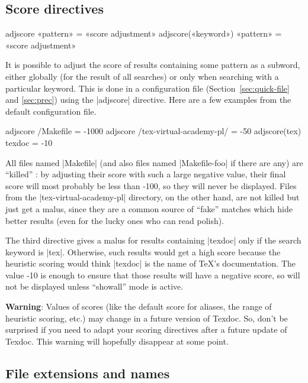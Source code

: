 \documentclass[draft]{texdoc-doc}
\begin{document}
\subsection{Score directives}
\label{sec:score}

\begin{htcode}
adjscore «pattern» = «score adjustment»
adjscore(«keyword») «pattern» = «score adjustment»
\end{htcode}
%
It is possible to adjust the score of results containing some pattern as a
subword, either globally (for the result of all searches) or only when
searching with a particular keyword. This is done in a configuration file
(Section~\ref{sec:quick-file} and \ref{sec:prec}) using the |adjscore|
directive. Here are a few examples from the default configuration file.

\begin{htcode}
adjscore /Makefile = -1000
adjscore /tex-virtual-academy-pl/ = -50
adjscore(tex) texdoc = -10
\end{htcode}
%
All files named |Makefile| (and also files named |Makefile-foo| if there are
any) are ``killed'' : by adjusting their score with such a large negative
value, their final score will most probably be less than -100, so they will
never be displayed. Files from the |tex-virtual-academy-pl| directory, on the
other hand, are not killed but just get a malus, since they are a common
source of ``fake'' matches which hide better results (even for the lucky ones
who can read polish).

The third directive gives a malus for results containing |texdoc| only if the
search keyword is |tex|. Otherwise, such results would get a high score
because the heuristic scoring would think |texdoc| is the name of \TeX's
documentation. The value -10 is enough to ensure that those results will have
a negative score, so will not be displayed unless ``showall'' mode is active.

\textbf{Warning}: Values of scores (like the default score for aliases, the
range of heuristic scoring, etc.) may change in a future version of Texdoc.
So, don't be surprised if you need to adapt your scoring directives after a
future update of Texdoc. This warning will hopefully disappear at some point.

\subsection{File extensions and names}
\label{sec:ext}
\end{document}
